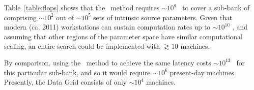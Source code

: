 Table~\ref{table:flops} shows that the \lloid\ method requires $\sim 10^8$ \flops\
to cover a sub-bank of comprising $\sim 10^2$ out of $\sim 10^5$ sets of intrinsic
source parameters.  Given that modern (ca. 2011) workstations can sustain
computation rates up to $\sim 10^{10}$ \flops{}, and assuming that other regions of the
parameter space have similar computational scaling, an entire search could be implemented
with $\gtrsim 10$ machines.

By comparison, using the \TD\ method to achieve the same latency costs $\sim 10^{13}$ \flops\ for this particular sub-bank, and so it would require $\sim 10^6$ present-day machines.  Presently, the \LIGO{} Data Grid consists of only $\sim 10^4$ machines.

